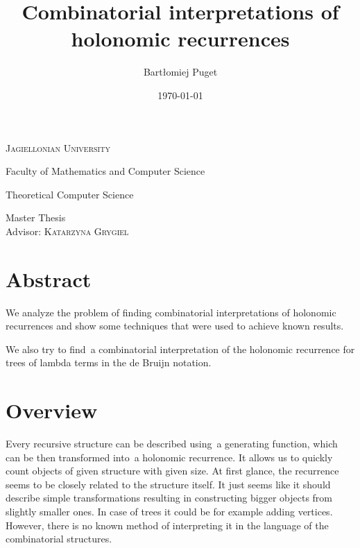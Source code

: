 \documentclass[final]{article}
\title{Combinatorial interpretations of holonomic recurrences}
\author{Bartłomiej Puget}
\date{\today}
\theoremstyle{definition}
\theoremstyle{definition}
\theoremstyle{remark}
\begin{document}
\begin{titlepage}
	\begin{center}
	\textsc{\LARGE Jagiellonian University}

	\Large Faculty of Mathematics and Computer Science

	\Large Theoretical Computer Science

	\vfill

	\vspace{1cm}
	\hrulefill
	\vspace{0.5cm}

    \makeatletter
    \huge \textsc{\@title}
    \makeatother

	\vspace{0.2cm}
	\hrulefill

	\vspace{1cm}
    \makeatletter
	\textsc{\Large \@author}
    \makeatother

	\vspace{1cm}
    \normalsize

	Master Thesis\\
	Advisor: \textsc{Katarzyna Grygiel}

	\vfill

    \makeatletter
    \@date
    \makeatother
	\end{center}
\end{titlepage}

\section*{Abstract}%
\label{sec:abstract}

We analyze the problem of finding combinatorial interpretations of holonomic recurrences and show some techniques that were used to achieve known results.

We also try to find~a combinatorial interpretation of the holonomic recurrence for trees of lambda terms in the de Bruijn notation.

\clearpage

\tableofcontents
\clearpage

\section{Overview}%

Every recursive structure can be described using~a generating function, which can be then transformed into~a holonomic recurrence. It allows us to quickly count objects of given structure with given size. At first glance, the recurrence seems to be closely related to the structure itself. It just seems like it should describe simple transformations resulting in constructing bigger objects from slightly smaller ones. In case of trees it could be for example adding vertices. However, there is no known method of interpreting it in the language of the combinatorial structures.
\end{document}
